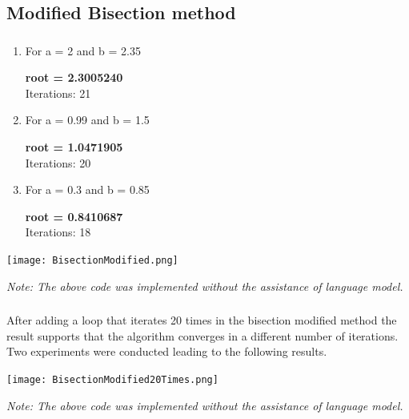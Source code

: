\documentclass{article}
\begin{document}
\vspace{0.7cm}
\subsection{Modified Bisection method}
\subsubsection{}

\begin{tcolorbox}[colback=blue!10, colframe=gray!80, width=\textwidth, sharp corners]
\begin{enumerate}
\item For a = 2 and b = 2.35
\begin{center}
    \textbf{root = 2.3005240} \\
    Iterations: 21
\end{center}
\item For a = 0.99 and b = 1.5
\begin{center}
    \textbf{root = 1.0471905} \\
    Iterations: 20
\end{center}
\item For a = 0.3 and b = 0.85
\begin{center}
    \textbf{root = 0.8410687} \\
    Iterations: 18
\end{center}



\end{enumerate}
\end{tcolorbox}



\begin{tcolorbox}[colback=gray!10, colframe=gray!80, width=\textwidth, sharp corners]
    \centering 
    \texttt{[image: BisectionModified.png]} 


    \vspace{0.5cm} 
    
    
    \small\textit{Note: The above code was implemented without the assistance of language model.}
\end{tcolorbox}
\vspace{0.6cm}

\subsubsection{}
After adding a loop that iterates 20 times in the bisection modified method the result supports that the algorithm converges in a different number of iterations. Two experiments were conducted leading to the following results.
\vspace{0.3cm}
\begin{tcolorbox}[colback=gray!10, colframe=gray!80, width=\textwidth, sharp corners]
    \centering 
    \texttt{[image: BisectionModified20Times.png]} 

    \vspace{0.2cm} 
    
    \small\textit{Note: The above code was implemented without the assistance of language model.}
\end{tcolorbox}
\end{document}
